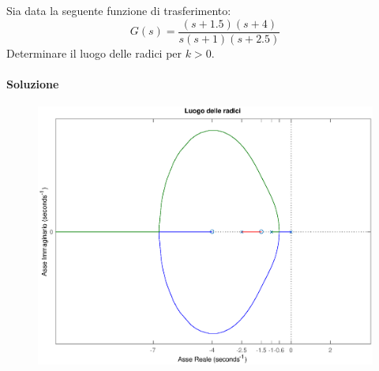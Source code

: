 \begin{esercizio}
Sia data la seguente funzione di trasferimento:
\[
	G(s) = \frac{(s+1.5)(s+4)}{s(s+1)(s+2.5)}
\]
Determinare il luogo delle radici per \(k>0\).

\paragraph{Soluzione}

\begin{figure}[ht]
	\centering
	\includegraphics[scale=.6]{mod1/assets/rl_ex34}
\end{figure}


\end{esercizio}
